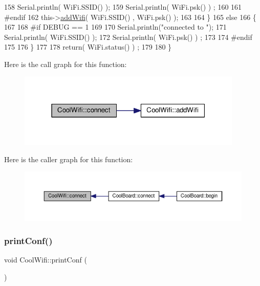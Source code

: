 \begin{DoxyCode}
158             Serial.println( WiFi.SSID() );
159             Serial.println( WiFi.psk() ) ;
160             
161 \textcolor{preprocessor}{        #endif}
162             this->\hyperlink{classCoolWifi_a914d7a1df14dd6b75345fb614c34e9d6}{addWifi}( WiFi.SSID() , WiFi.psk() );
163         
164     \}
165     \textcolor{keywordflow}{else}
166     \{
167 
168 \textcolor{preprocessor}{    #if DEBUG == 1}
169 
170         Serial.println(\textcolor{stringliteral}{"connected to "});
171         Serial.println( WiFi.SSID() );
172         Serial.println( WiFi.psk() ) ;
173                 
174 \textcolor{preprocessor}{    #endif}
175     
176     \}
177     
178     \textcolor{keywordflow}{return}( WiFi.status() ) ;
179 
180 \}
\end{DoxyCode}
Here is the call graph for this function\+:\nopagebreak
\begin{figure}[H]
\begin{center}
\leavevmode
\includegraphics[width=304pt]{classCoolWifi_ad060353050f40d032a2dbf9e54a768bf_cgraph}
\end{center}
\end{figure}
Here is the caller graph for this function\+:\nopagebreak
\begin{figure}[H]
\begin{center}
\leavevmode
\includegraphics[width=350pt]{classCoolWifi_ad060353050f40d032a2dbf9e54a768bf_icgraph}
\end{center}
\end{figure}
\mbox{\label{classCoolWifi_a9e6105c6d13d35ec510f6633da9e0223}} 
\subsubsection{\texorpdfstring{print\+Conf()}{printConf()}}
{\footnotesize\ttfamily void Cool\+Wifi\+::print\+Conf (\begin{DoxyParamCaption}{ }\end{DoxyParamCaption})}

